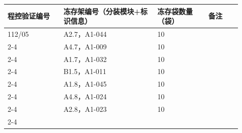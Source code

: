 \documentclass[UTF8,10pt,a4paper,fontset=fandol]{ctexart}
\newcommand{\fieldvalue}[1]{#1}
\newcommand{\handwritten}[1]{#1}
\begin{document}
\vspace{0.4em}

\begin{tabular}{|p{0.22\linewidth}|p{0.37\linewidth}|p{0.20\linewidth}|p{0.13\linewidth}|}
\hline
程控验证编号 & 冻存架编号（分装模块+标识信息） & 冻存袋数量（袋） & 备注 \\ \hline

\fieldvalue{\handwritten{112/05}} &
\fieldvalue{\handwritten{A2.7，A1-044}} &
\fieldvalue{\handwritten{10}} & \\ \cline{2-4}

&
\fieldvalue{\handwritten{A4.7，A1-009}} &
\fieldvalue{\handwritten{10}} & \\ \cline{2-4}

&
\fieldvalue{\handwritten{A1.7，A1-032}} &
\fieldvalue{\handwritten{10}} & \\ \cline{2-4}

&
\fieldvalue{\handwritten{B1.5，A1-011}} &
\fieldvalue{\handwritten{10}} & \\ \cline{2-4}

&
\fieldvalue{\handwritten{A1.8，A1-045}} &
\fieldvalue{\handwritten{10}} & \\ \cline{2-4}

&
\fieldvalue{\handwritten{A4.8，A1-024}} &
\fieldvalue{\handwritten{10}} & \\ \cline{2-4}

&
\fieldvalue{\handwritten{A2.8，A1-023}} &
\fieldvalue{\handwritten{10}} & \\ \cline{2-4}


\end{tabular}
\end{document}
